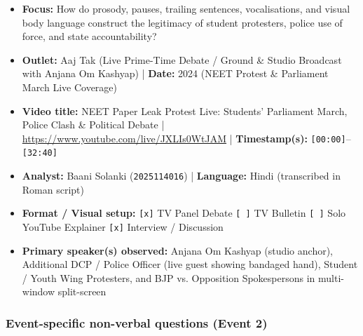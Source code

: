\documentclass[10pt,a4paper]{article}
\begin{document}
\begin{itemize}
  \item \textbf{Focus:} How do prosody, pauses, trailing sentences, vocalisations, and visual body language construct the legitimacy of student protesters, police use of force, and state accountability?
  \item \textbf{Outlet:} Aaj Tak (Live Prime-Time Debate / Ground \& Studio Broadcast with Anjana Om Kashyap) | \textbf{Date:} 2024 (NEET Protest \& Parliament March Live Coverage)
  \item \textbf{Video title:} NEET Paper Leak Protest Live: Students' Parliament March, Police Clash \& Political Debate | \href{https://www.youtube.com/live/JXLIs0WtJAM}{https://www.youtube.com/live/JXLIs0WtJAM} | \textbf{Timestamp(s):} \texttt{[00:00]}--\texttt{[32:40]}
  \item \textbf{Analyst:} Baani Solanki (\texttt{2025114016}) | \textbf{Language:} Hindi (transcribed in Roman script)
  \item \textbf{Format / Visual setup:} \texttt{[x]} TV Panel Debate \texttt{[ ]} TV Bulletin \texttt{[ ]} Solo YouTube Explainer \texttt{[x]} Interview / Discussion
  \item \textbf{Primary speaker(s) observed:} Anjana Om Kashyap (studio anchor), Additional DCP / Police Officer (live guest showing bandaged hand), Student / Youth Wing Protesters, and BJP vs. Opposition Spokespersons in multi-window split-screen
\end{itemize}

\subsubsection*{Event-specific non-verbal questions (Event 2)}
\end{document}
